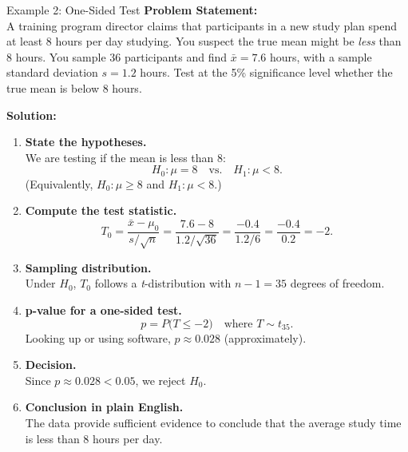 \documentclass[9pt]{extarticle}
\begin{document}
\begin{examplebox}{Example 2: One-Sided Test}{}
\scriptsize\textbf{Problem Statement:}\\
A training program director claims that participants in a new study plan spend at least 8 hours per day studying. You suspect the true mean might be \textit{less} than 8 hours. You sample 36 participants and find $\bar{x} = 7.6$ hours, with a sample standard deviation $s = 1.2$ hours. Test at the 5\% significance level whether the true mean is below 8 hours.

\textbf{Solution:}\\
\begin{enumerate}
    \item \textbf{State the hypotheses.}\\
    We are testing if the mean is less than 8:
    \[
        H_0: \mu = 8 \quad\text{vs.}\quad H_1: \mu < 8.
    \]
    (Equivalently, $H_0: \mu \ge 8$ and $H_1: \mu < 8$.)

    \item \textbf{Compute the test statistic.}\\
    \[
        T_0 = \frac{\bar{x} - \mu_0}{s / \sqrt{n}}
        = \frac{7.6 - 8}{1.2 / \sqrt{36}}
        = \frac{-0.4}{1.2 / 6}
        = \frac{-0.4}{0.2}
        = -2.
    \]
    \item \textbf{Sampling distribution.}\\
    Under $H_0$, $T_0$ follows a \emph{t}-distribution with $n - 1 = 35$ degrees of freedom.

    \item \textbf{p-value for a one-sided test.}\\
    \[
        p = P\big(T \leq -2\big)\quad\text{where }T \sim t_{35}.
    \]
    Looking up or using software, $p \approx 0.028$ (approximately).
    
    \item \textbf{Decision.}\\
    Since $p \approx 0.028 < 0.05$, we reject $H_0$.
    
    \item \textbf{Conclusion in plain English.}\\
    The data provide sufficient evidence to conclude that the average study time is less than 8 hours per day.
\end{enumerate}
\end{examplebox}
\end{document}

